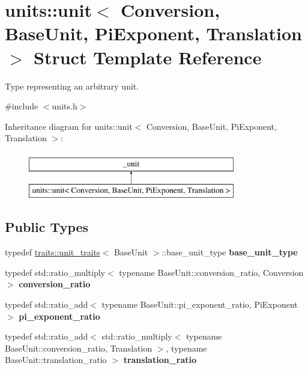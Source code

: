 \hypertarget{structunits_1_1unit}{}\section{units\+:\+:unit$<$ Conversion, Base\+Unit, Pi\+Exponent, Translation $>$ Struct Template Reference}
\label{structunits_1_1unit}


Type representing an arbitrary unit.  




{\ttfamily \#include $<$units.\+h$>$}

Inheritance diagram for units\+:\+:unit$<$ Conversion, Base\+Unit, Pi\+Exponent, Translation $>$\+:\begin{figure}[H]
\begin{center}
\leavevmode
\includegraphics[height=2.000000cm]{structunits_1_1unit}
\end{center}
\end{figure}
\subsection*{Public Types}
\begin{DoxyCompactItemize}
\item 
\hypertarget{structunits_1_1unit_a04f963a5f260416cd96c9f57df5d2421}{}typedef \hyperlink{structunits_1_1traits_1_1unit__traits}{traits\+::unit\+\_\+traits}$<$ Base\+Unit $>$\+::base\+\_\+unit\+\_\+type {\bfseries base\+\_\+unit\+\_\+type}\label{structunits_1_1unit_a04f963a5f260416cd96c9f57df5d2421}

\item 
\hypertarget{structunits_1_1unit_a0f2b640f43170629369706775699fdbe}{}typedef std\+::ratio\+\_\+multiply$<$ typename Base\+Unit\+::conversion\+\_\+ratio, Conversion $>$ {\bfseries conversion\+\_\+ratio}\label{structunits_1_1unit_a0f2b640f43170629369706775699fdbe}

\item 
\hypertarget{structunits_1_1unit_aadc106afe2fedc05c154ff9f2c16025f}{}typedef std\+::ratio\+\_\+add$<$ typename Base\+Unit\+::pi\+\_\+exponent\+\_\+ratio, Pi\+Exponent $>$ {\bfseries pi\+\_\+exponent\+\_\+ratio}\label{structunits_1_1unit_aadc106afe2fedc05c154ff9f2c16025f}

\item 
\hypertarget{structunits_1_1unit_a0cdaa6959c83b6ddb1038d99a31e7814}{}typedef std\+::ratio\+\_\+add$<$ std\+::ratio\+\_\+multiply$<$ typename Base\+Unit\+::conversion\+\_\+ratio, Translation $>$, typename Base\+Unit\+::translation\+\_\+ratio $>$ {\bfseries translation\+\_\+ratio}\label{structunits_1_1unit_a0cdaa6959c83b6ddb1038d99a31e7814}

\end{DoxyCompactItemize}


